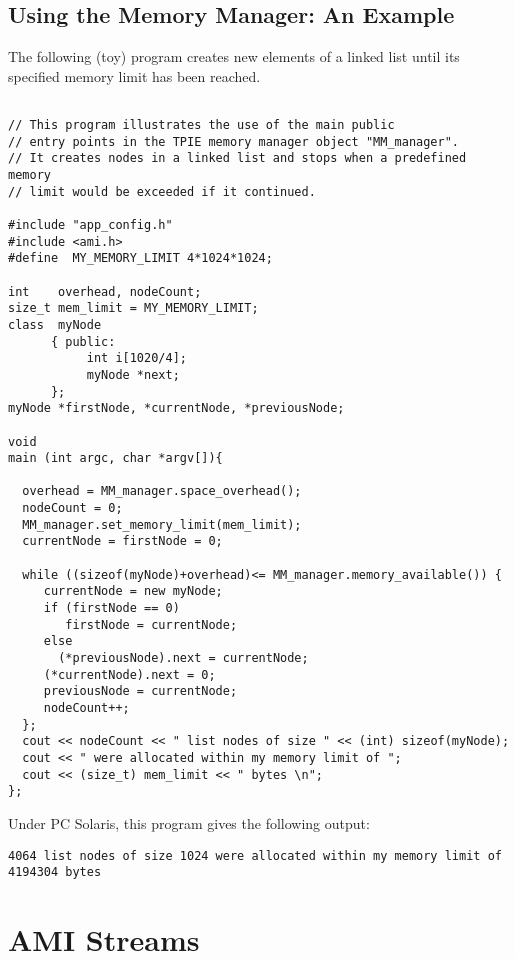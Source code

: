 \subsection{Using the Memory Manager: An Example}

The following (toy) program creates new elements of a linked
list until its specified memory limit has been reached.

\begin{verbatim}

// This program illustrates the use of the main public 
// entry points in the TPIE memory manager object "MM_manager".
// It creates nodes in a linked list and stops when a predefined memory 
// limit would be exceeded if it continued.

#include "app_config.h"
#include <ami.h>
#define  MY_MEMORY_LIMIT 4*1024*1024;

int    overhead, nodeCount;
size_t mem_limit = MY_MEMORY_LIMIT;
class  myNode 
      { public:
           int i[1020/4];
           myNode *next;
      };
myNode *firstNode, *currentNode, *previousNode;

void 
main (int argc, char *argv[]){

  overhead = MM_manager.space_overhead();
  nodeCount = 0;
  MM_manager.set_memory_limit(mem_limit);
  currentNode = firstNode = 0;

  while ((sizeof(myNode)+overhead)<= MM_manager.memory_available()) { 
     currentNode = new myNode;
     if (firstNode == 0) 
        firstNode = currentNode;
     else
       (*previousNode).next = currentNode;
     (*currentNode).next = 0;
     previousNode = currentNode;
     nodeCount++;
  };
  cout << nodeCount << " list nodes of size " << (int) sizeof(myNode); 
  cout << " were allocated within my memory limit of ";
  cout << (size_t) mem_limit << " bytes \n";
};

\end{verbatim}

Under PC Solaris, this program gives the following output:
\begin{verbatim}
4064 list nodes of size 1024 were allocated within my memory limit of 4194304 bytes
\end{verbatim}


\section{AMI Streams}

